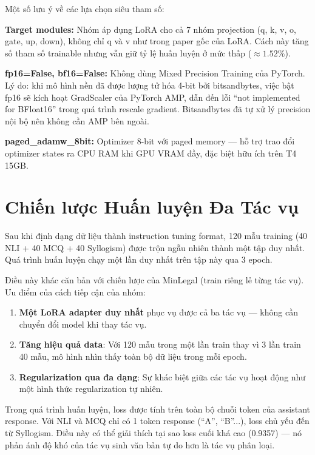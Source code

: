 \documentclass[fontsize=13pt,a4paper,oneside,DIV=calc,chapterprefix=true]{scrbook}
\begin{document}
Một số lưu ý về các lựa chọn siêu tham số:

\textbf{Target modules:} Nhóm áp dụng LoRA cho cả 7 nhóm projection (q, k, v, o, gate, up,
down), không chỉ q và v như trong paper gốc của LoRA. Cách này tăng số tham số trainable nhưng
vẫn giữ tỷ lệ huấn luyện ở mức thấp ($\approx 1.52\%$).

\textbf{fp16=False, bf16=False:} Không dùng Mixed Precision Training của PyTorch. Lý do: khi mô
hình nền đã được lượng tử hóa 4-bit bởi bitsandbytes, việc bật fp16 sẽ kích hoạt GradScaler
của PyTorch AMP, dẫn đến lỗi ``not implemented for BFloat16'' trong quá trình rescale gradient.
Bitsandbytes đã tự xử lý precision nội bộ nên không cần AMP bên ngoài.

\textbf{paged\_adamw\_8bit:} Optimizer 8-bit với paged memory --- hỗ trợ trao đổi optimizer
states ra CPU RAM khi GPU VRAM đầy, đặc biệt hữu ích trên T4 15GB.

\section{Chiến lược Huấn luyện Đa Tác vụ}

Sau khi định dạng dữ liệu thành instruction tuning format, 120 mẫu training (40 NLI + 40 MCQ
+ 40 Syllogism) được trộn ngẫu nhiên thành một tập duy nhất. Quá trình huấn luyện chạy một
lần duy nhất trên tập này qua 3 epoch.

Điều này khác căn bản với chiến lược của MinLegal (train riêng lẻ từng tác vụ). Ưu điểm của
cách tiếp cận của nhóm:

\begin{enumerate}
  \item \textbf{Một LoRA adapter duy nhất} phục vụ được cả ba tác vụ --- không cần chuyển đổi
    model khi thay tác vụ.
  \item \textbf{Tăng hiệu quả data}: Với 120 mẫu trong một lần train thay vì 3 lần train 40
    mẫu, mô hình nhìn thấy toàn bộ dữ liệu trong mỗi epoch.
  \item \textbf{Regularization qua đa dạng}: Sự khác biệt giữa các tác vụ hoạt động như một
    hình thức regularization tự nhiên.
\end{enumerate}

Trong quá trình huấn luyện, loss được tính trên toàn bộ chuỗi token của assistant response.
Với NLI và MCQ chỉ có 1 token response (``A'', ``B''...), loss chủ yếu đến từ Syllogism. Điều
này có thể giải thích tại sao loss cuối khá cao (0.9357) --- nó phản ánh độ khó của tác vụ
sinh văn bản tự do hơn là tác vụ phân loại.
\end{document}
